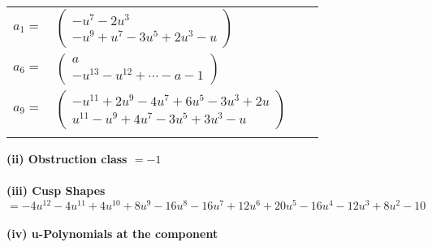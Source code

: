 \documentclass[1p]{elsarticle_modified}
\theoremstyle{definition}
\begin{document}
\begin{tabular}{m{7pt} m{180pt} m{7pt} m{180pt} }
\flushright $a_{1}=$&$\begin{pmatrix}- u^7-2 u^3\\- u^9+u^7-3 u^5+2 u^3- u\end{pmatrix}$ \\
\flushright $a_{6}=$&$\begin{pmatrix}a\\- u^{13}- u^{12}+\cdots- a-1\end{pmatrix}$ \\
\flushright $a_{9}=$&$\begin{pmatrix}- u^{11}+2 u^9-4 u^7+6 u^5-3 u^3+2 u\\u^{11}- u^9+4 u^7-3 u^5+3 u^3- u\end{pmatrix}$\\&\end{tabular}
\flushleft \textbf{(ii) Obstruction class $= -1$}\\~\\
\flushleft \textbf{(iii) Cusp Shapes $= -4 u^{12}-4 u^{11}+4 u^{10}+8 u^9-16 u^8-16 u^7+12 u^6+20 u^5-16 u^4-12 u^3+8 u^2-10$}\\~\\
\newpage\renewcommand{\arraystretch}{1}
\flushleft \textbf{(iv) u-Polynomials at the component}\newline \\
\end{document}
